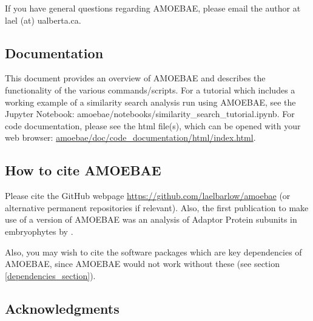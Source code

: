 \documentclass[12pt,letterpaper]{article}
\begin{document}
\begin{linenumbers}
If you have general questions regarding AMOEBAE, please email the author at
    lael (at) ualberta.ca.

\subsection{Documentation}

This document provides an overview of AMOEBAE and describes the functionality
of the various commands/scripts. For a tutorial which includes a working
example of a similarity search analysis run using AMOEBAE, see the Jupyter
Notebook: amoebae/notebooks/similarity\_search\_tutorial.ipynb. For code
documentation, please see the html file(s), which can be opened with your web
browser: \url{amoebae/doc/code_documentation/html/index.html}.

%
%
%
%
%
%


\subsection{How to cite AMOEBAE}

Please cite the GitHub webpage \url{https://github.com/laelbarlow/amoebae} (or
alternative permanent repositories if relevant). Also, the first publication to
make use of a version of AMOEBAE was an analysis of Adaptor Protein subunits in
embryophytes by \cite{larson2019}.

Also, you may wish to cite the software packages which are key dependencies of
AMOEBAE, since AMOEBAE would not work without these (see section
\ref{dependencies_section}).

\subsection{Acknowledgments}


\end{linenumbers}
\end{document}
